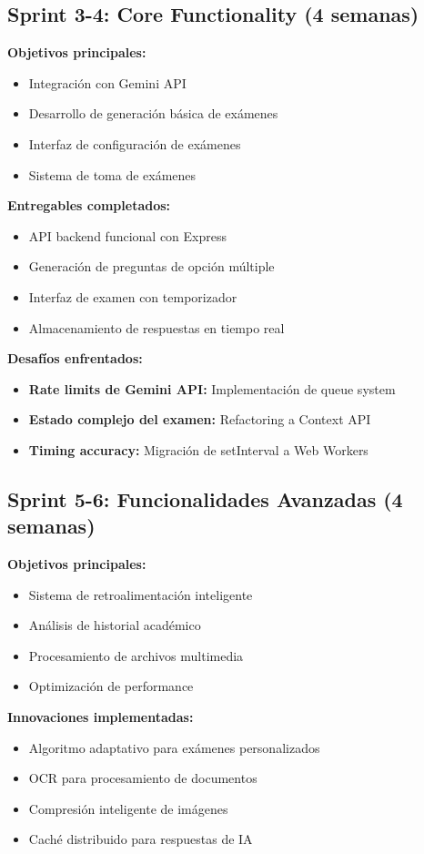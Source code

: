 \documentclass[12pt,a4paper]{report}
\begin{document}
\subsection{Sprint 3-4: Core Functionality (4 semanas)}

\textbf{Objetivos principales:}
\begin{itemize}
\item Integración con Gemini API
\item Desarrollo de generación básica de exámenes
\item Interfaz de configuración de exámenes
\item Sistema de toma de exámenes
\end{itemize}

\textbf{Entregables completados:}
\begin{itemize}
\item API backend funcional con Express
\item Generación de preguntas de opción múltiple
\item Interfaz de examen con temporizador
\item Almacenamiento de respuestas en tiempo real
\end{itemize}

\textbf{Desafíos enfrentados:}
\begin{itemize}
\item \textbf{Rate limits de Gemini API:} Implementación de queue system
\item \textbf{Estado complejo del examen:} Refactoring a Context API
\item \textbf{Timing accuracy:} Migración de setInterval a Web Workers
\end{itemize}

\subsection{Sprint 5-6: Funcionalidades Avanzadas (4 semanas)}

\textbf{Objetivos principales:}
\begin{itemize}
\item Sistema de retroalimentación inteligente
\item Análisis de historial académico
\item Procesamiento de archivos multimedia
\item Optimización de performance
\end{itemize}

\textbf{Innovaciones implementadas:}
\begin{itemize}
\item Algoritmo adaptativo para exámenes personalizados
\item OCR para procesamiento de documentos
\item Compresión inteligente de imágenes
\item Caché distribuido para respuestas de IA
\end{itemize}
\end{document}
